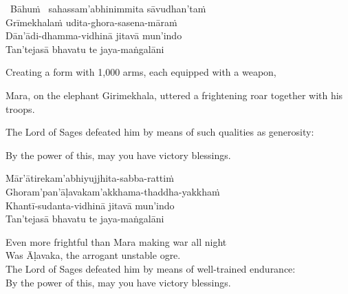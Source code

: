 \begin{pali-hangtogether}
  \anglebracketleft\ \hspace{-0.5mm}Bāhuṁ \hspace{-0.5mm}\anglebracketright\ sahassam'abhinimmita sāvudhan'taṁ\\
  Grīmekhalaṁ udita-ghora-sasena-māraṁ\\
  Dān'ādi-dhamma-vidhinā jitavā\makeatletter\hyperlink{endnote129-appendix}\makeatother
  mun'indo\\
  Tan'tejasā bhavatu te jaya-maṅgalāni
\end{pali-hangtogether}

\begin{english-verses}
  Creating a form with 1,000 arms, each equipped with a weapon,
  \begin{english-hangtogether-verses}
    Mara, on the elephant Girimekhala, uttered a frightening roar together with his troops.
  \end{english-hangtogether-verses}
  \begin{english-hangtogether-verses}
    The Lord of Sages defeated him by means of such qualities as generosity:
  \end{english-hangtogether-verses}
  By the power of this, may you have victory blessings.
\end{english-verses}

\begin{pali-hang-continued}
  Mār'ātirekam'abhiyujjhita-sabba-rattiṁ\\
  Ghoram'pan'āḷavakam'akkhama-thaddha-yakkhaṁ\\
  Khantī-sudanta-vidhinā jitavā mun'indo\\
  Tan'tejasā bhavatu te jaya-maṅgalāni
\end{pali-hang-continued}

\begin{english-verses}
  Even more frightful than Mara making war all night\\
  Was Āḷavaka, the arrogant unstable ogre.\\
  The Lord of Sages defeated him by means of well-trained endurance:\\
  By the power of this, may you have victory blessings.
\end{english-verses}


